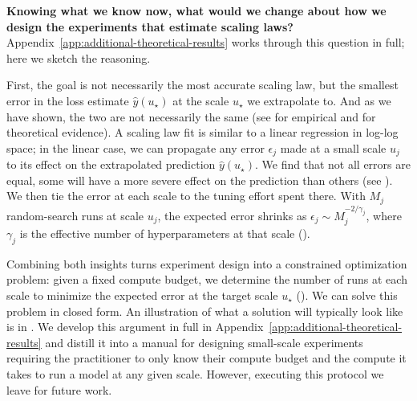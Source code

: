 \textbf{Knowing what we know now, what would we change about how we design the experiments that estimate scaling laws?} Appendix~\ref{app:additional-theoretical-results} works through this question in full; here we sketch the reasoning.

First, the goal is not necessarily the most accurate scaling law, but the smallest error in the loss estimate $\hat{y}(u_\star)$ at the scale $u_\star$ we extrapolate to. And as we have shown, the two are not necessarily the same (see  for empirical and  for theoretical evidence). 
A scaling law fit is similar to a linear regression in log-log space; in the linear case, we can propagate any error $\epsilon_j$ made at a small scale $u_j$ to its effect on the extrapolated prediction $\hat{y}(u_\star)$. We find that not all errors are equal, some will have a more severe effect on the prediction than others (see ).
%
We then tie the error at each scale to the tuning effort spent there. With $M_j$ random-search runs at scale $u_j$, the expected error shrinks as $\epsilon_j \sim M_j^{-2/\gamma_j}$, where $\gamma_j$ is the effective number of hyperparameters at that scale (). 

Combining both insights turns experiment design into a constrained optimization problem: given a fixed compute budget, we determine the number of runs at each scale to minimize the expected error at the target scale $u_\star$ (). 
We can solve this problem in closed form. An illustration of what a solution will typically look like is in . 
 We develop this argument in full in Appendix~\ref{app:additional-theoretical-results} and distill it into a manual for designing small-scale experiments requiring the practitioner to only know their compute budget and the compute it takes to run a model at any given scale. However, executing this protocol we leave for future work.
